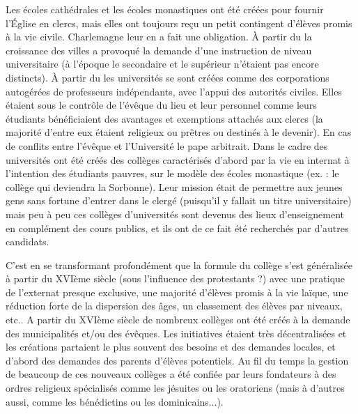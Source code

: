 Les écoles cathédrales et les écoles monastiques ont été créées pour fournir l'Église en clercs, mais elles ont toujours reçu un petit contingent d'élèves promis à la vie civile. Charlemagne leur en a fait une obligation. À partir du  la croissance des villes a provoqué la demande d'une instruction de niveau universitaire (à l'époque le secondaire et le supérieur n'étaient pas encore distincts). À partir du  les universités se sont créées comme des corporations autogérées de professeurs indépendants, avec l'appui des autorités civiles. Elles étaient sous le contrôle de l'évêque du lieu et leur personnel comme leurs étudiants bénéficiaient des avantages et exemptions attachés aux clercs (la majorité d'entre eux étaient religieux ou prêtres ou destinés à le devenir). En cas de conflits entre l'évêque et l'Université le pape arbitrait. Dans le cadre des universités ont été créés des collèges caractérisés d'abord par la vie en internat à l'intention des étudiants pauvres, sur le modèle des écoles monastique (ex. : le collège qui deviendra la Sorbonne). Leur mission était de permettre aux jeunes gens sans fortune d'entrer dans le clergé (puisqu'il y fallait un titre universitaire) mais peu à peu ces collèges d'universités sont devenus des lieux d'enseignement en complément des cours publics, et ils ont de ce fait été recherchés par d'autres candidats. 

C'est en se transformant profondément que la formule du collège s'est généralisée à partir du XVIème siècle (sous l'influence des protestants ?) avec une pratique de l'externat presque exclusive, une majorité d'élèves promis à la vie laïque, une réduction forte de la dispersion des âges, un classement des élèves par niveaux, etc.. A partir du XVIème siècle de nombreux collèges ont été créés à la demande des municipalités et/ou des évêques. Les initiatives étaient très décentralisées et les créations partaient le plus souvent des besoins et des demandes locales, et d'abord des demandes des parents d'élèves potentiels. Au fil du temps la gestion de beaucoup de ces nouveaux collèges a été confiée par leurs fondateurs à des ordres religieux spécialisés comme les jésuites ou les oratoriens (mais à d'autres aussi, comme les bénédictins ou les dominicains...). 

